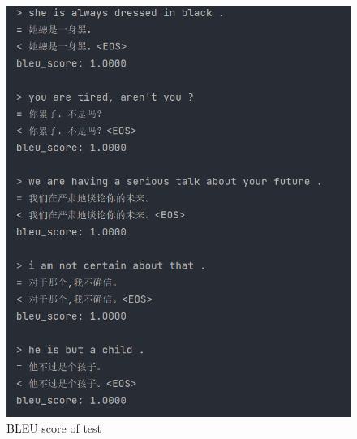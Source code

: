 \documentclass[journal, a4paper]{IEEEtran}
\begin{document}
	\begin{figure}
		\begin{center}
		\includegraphics[width=\columnwidth]{images/bleu.png}
		\caption{BLEU score of test}
		\label{fig:bleu}
		\end{center}
	\end{figure}
	
	

\printbibliography

\end{document}

